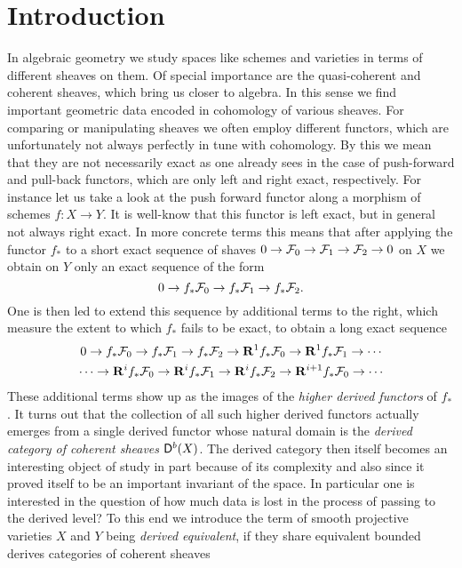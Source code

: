 \section*{Introduction}

In algebraic geometry we study spaces like schemes and varieties in terms of different sheaves on them. Of special importance are the quasi-coherent and coherent sheaves, which bring us closer to algebra. In this sense we find important geometric data encoded in cohomology of various sheaves. For comparing or manipulating sheaves we often employ different functors, which are unfortunately not always perfectly in tune with cohomology. By this we mean that they are not necessarily exact as one already sees in the case of push-forward and pull-back functors, which are only left and right exact, respectively.
For instance let us take a look at the push forward functor along a morphism of schemes $f \colon X \to Y$. It is well-know that this functor is left exact, but in general not always right exact. In more concrete terms this means that after applying the functor $f_*$ to a short exact sequence of shaves $0 \to \mathcal F_0 \to \mathcal F_1 \to \mathcal F_2 \to 0$ on $X$ we obtain on $Y$ only an exact sequence of the form
\[
    0 \to f_*\mathcal F_0 \to f_*\mathcal F_1 \to f_*\mathcal F_2.
\]
One is then led to extend this sequence by additional terms to the right, which measure the extent to which $f_*$ fails to be exact, to obtain a long exact sequence
\begin{multline*}
    0 \to f_*\mathcal F_0 \to f_*\mathcal F_1 \to f_*\mathcal F_2 \to \mathbf{R}^{1}f_*\mathcal F_0 \to \mathbf{R}^{1}f_*\mathcal F_1 \to \cdots \\
    \cdots \to \mathbf{R}^{i}f_*\mathcal F_0 \to \mathbf{R}^{i}f_*\mathcal F_1 \to \mathbf{R}^{i}f_*\mathcal F_2 \to \mathbf{R}^{i+1}f_*\mathcal F_0 \to \cdots
\end{multline*}
These additional terms show up as the images of the \emph{higher derived functors} of $f_*$. It turns out that the collection of all such higher derived functors actually emerges from a single derived functor whose natural domain is the \emph{derived category of coherent sheaves} $\mathsf{D}^b(X)$. The derived category then itself becomes an interesting object of study in part because of its complexity and also since it proved itself to be an important invariant of the space. In particular one is interested in the question of how much data is lost in the process of passing to the derived level? To this end we introduce the term of smooth projective varieties $X$ and $Y$ being \emph{derived equivalent}, if they share equivalent bounded derives categories of coherent sheaves \ie 
